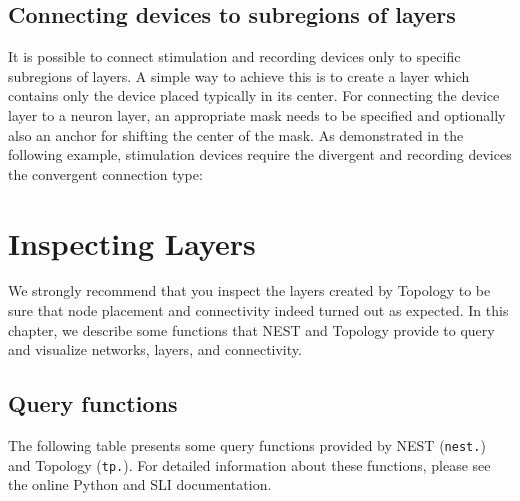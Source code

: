 \documentclass[a4paper,12pt]{report}
\begin{document}
\section{Connecting devices to subregions of layers}\label{sec:dev_subregions}

It is possible to connect stimulation and recording devices only to specific
subregions of layers. A simple way to achieve this is to create a layer
which contains only the device placed typically in its center.
For connecting the device layer to a neuron layer, an appropriate mask
needs to be specified and optionally also an anchor for shifting the
center of the mask.
As demonstrated in the following example, stimulation devices require the
divergent and recording devices the convergent connection type:





\chapter{Inspecting Layers}\label{sec:inspection}

We strongly recommend that you inspect the layers created by Topology
to be sure that node placement and connectivity indeed turned out as
expected. In this chapter, we describe some functions that NEST and
Topology provide to query and visualize networks, layers, and
connectivity.

\section{Query functions}\label{sec:queries}

The following table presents some query functions provided by NEST
(\lstinline!nest.!) and Topology (\lstinline!tp.!). For detailed
information about these functions, please see the online Python and
SLI documentation. 
\end{document}
